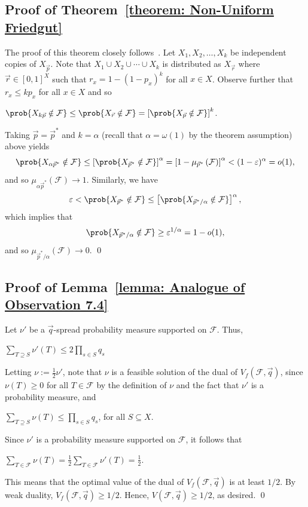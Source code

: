 \documentclass[12pt]{article}
\begin{document}
\subsection{Proof of Theorem~\ref{theorem: Non-Uniform Friedgut}}
\label{section: Non-Uniform Friedgut Proof}



The proof of this theorem closely follows~\cite{Bollobs1987ThresholdF}.
Let $X_1, X_2,\ldots, X_k$ be independent copies of $X_{\vec{p}}$. Note that $X_1\cup X_2\cup\cdots\cup X_k$ is distributed as $X_{\vec{r}}$ where $\vec{r}\in [0,1]^X$ such that $r_x = 1-\left(1-p_x\right)^k$ for all $x\in X$. Observe further that $r_x\leq kp_x$ for all $x\in X$ and so
\begin{center}
    $\prob{X_{k\vec{p}}\notin\mathcal{F}}\leq \prob{X_{\vec{r}}\notin\mathcal{F}} = \left[\prob{X_{\vec{p}}\notin\mathcal{F}}\right]^k$.
\end{center}
Taking $\vec{p} = \vec{p}^*$  and $k = \alpha$ (recall that $\alpha=\omega(1)$ by the theorem assumption) above yields
\[
    \prob{X_{\alpha\vec{p}^*}\notin\mathcal{F}}\leq \left[ \prob{X_{\vec{p}^*}\notin\mathcal{F}}\right]^\alpha = \left[1-\mu_{\vec{p}^*}\left(\mathcal{F}\right)\right]^ \alpha < (1-\varepsilon)^\alpha = o(1),
\]
and so $\mu_{\alpha\vec{p}^*}(\mathcal{F})\rightarrow 1$. Similarly, we have
\[
    \varepsilon < \prob{X_{\vec{p}^*}\notin\mathcal{F}}\leq\left[\prob{X_{\vec{p}^*/\alpha}\notin\mathcal{F}}\right]^\alpha,
\]
which implies that
\[
    \prob{X_{\vec{p}^*/\alpha}\notin\mathcal{F}}\geq \varepsilon^{1/\alpha} = 1-o(1),
\]
and so $\mu_{\vec{p}^*/\alpha}(\mathcal{F})\rightarrow 0$.
\qed


\subsection{Proof of Lemma~\ref{lemma: Analogue of Observation 7.4}}
\label{section: Spread Lemma Proof}


Let $\nu'$ be a $\vec{q}$-spread probability measure supported on $\mathcal{F}$. Thus, 
\begin{center}
    $\displaystyle\sum\limits_{T\supseteq S} \nu'(T)\leq 2\prod\limits_{s\in S} q_s$ \quad {}
\end{center}
 Letting $\nu := \frac{1}{2}\nu'$, note that $\nu$ is a feasible solution of the dual of $V_f(\mathcal{F}, \vec{q})$, since $\nu(T)\geq 0$ for all $T\in\mathcal{F}$ by the definition of $\nu$ and the fact that $\nu'$ is a probability measure, and
\begin{center}
$\displaystyle\sum\limits_{T\supseteq S} \nu(T)\leq\prod\limits_{s\in S} q_s$, \quad for all $S\subseteq X$.
\end{center}
 Since $\nu'$ is a probability measure supported on $\mathcal{F}$, it follows that
\begin{center}
    $\displaystyle\sum\limits_{T\in\mathcal{F}} \nu(T) = \frac{1}{2}\sum\limits_{T\in\mathcal{F}} \nu'(T) = \frac{1}{2}$.
\end{center}
This means that the optimal value of the dual of $V_f(\mathcal{F}, \vec{q})$ is at least $1/2$. By weak duality, $V_f(\mathcal{F}, \vec{q})\geq 1/2$. Hence, $V(\mathcal{F},\vec{q})\geq 1/2$, as desired.
\qed
\end{document}
